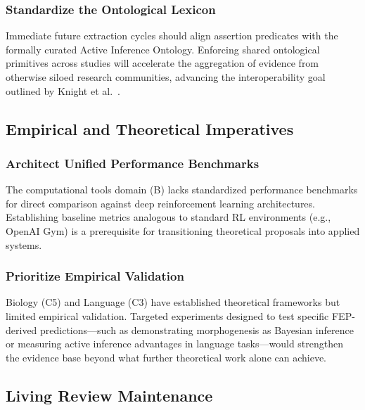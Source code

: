 \documentclass[
  english,
]{article}
\begin{document}
{{{{{{{{{{{{{{{{\subsubsection{Standardize the Ontological
Lexicon}\label{standardize-the-ontological-lexicon}

Immediate future extraction cycles should align assertion predicates
with the formally curated Active Inference Ontology. Enforcing shared
ontological primitives across studies will accelerate the aggregation of
evidence from otherwise siloed research communities, advancing the
interoperability goal outlined by Knight et al.~\citep{knight2022fep}.

\subsection{Empirical and Theoretical
Imperatives}\label{empirical-and-theoretical-imperatives}

\subsubsection{Architect Unified Performance
Benchmarks}\label{architect-unified-performance-benchmarks}

The computational tools domain (B) lacks standardized performance
benchmarks for direct comparison against deep reinforcement learning
architectures. Establishing baseline metrics analogous to standard RL
environments (e.g., OpenAI Gym) is a prerequisite for transitioning
theoretical proposals into applied systems.

\subsubsection{Prioritize Empirical
Validation}\label{prioritize-empirical-validation}

Biology (C5) and Language (C3) have established theoretical frameworks
but limited empirical validation. Targeted experiments designed to test
specific FEP-derived predictions---such as demonstrating morphogenesis
as Bayesian inference or measuring active inference advantages in
language tasks---would strengthen the evidence base beyond what further
theoretical work alone can achieve.

\subsection{Living Review Maintenance}\label{living-review-maintenance}

}}}}}}}}}}}}}}}}
\end{document}
